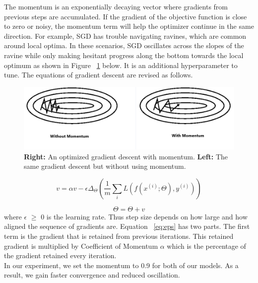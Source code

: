 The momentum is an exponentially decaying vector where gradients from
previous steps are accumulated. If the gradient of the objective function is
close to zero or noisy, the momentum term will help the optimizer continue in
the same direction. For example, SGD has trouble navigating ravines, which are common around local optima. In these scenarios, SGD oscillates across the slopes of the ravine while only making hesitant progress along the bottom towards the local optimum as shown in Figure ~\ref{fig:momentum} below.  It is an additional
hyperparameter to tune. The equations of gradient descent are revised as follows.
\begin{figure}[ht]
\centering
\includegraphics[width=0.80\columnwidth]{Figures/mm.png}
\decoRule
\caption[\textbf{Right:} An optimized gradient descent with momentum. \textbf{Left:} The same gradient descent but without using momentum.]{\textbf{Right:} An optimized gradient descent with momentum. \textbf{Left:} The same gradient descent but without using momentum.}
\label{fig:momentum}
\end{figure}
\begin{equation}\label{eq:eps}
     v=\alpha v-\epsilon \Delta _{\Theta }(\frac{1}{m}\sum _{i}L(f(x^{(i)};\Theta ),y^{(i)}))
\end{equation}

\begin{equation}
    \Theta =\Theta +v
\end{equation}
where $\epsilon$ $\geq$ 0 is the learning rate. Thus step size depends on how large and how aligned the sequence of gradients are.
Equation ~\ref{eq:eps} has two parts. The first term is the gradient that is retained from previous iterations. This retained gradient is multiplied by Coefficient of Momentum $\alpha$ which is the percentage of the gradient retained every iteration.\\

In our experiment, we set the momentum to 0.9 for both of our models. As a result, we gain faster convergence and reduced oscillation.


